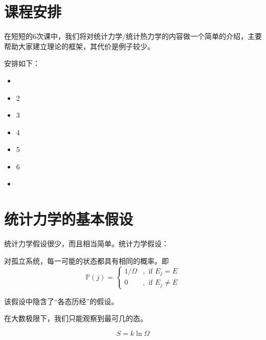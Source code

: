 \chapter*{课程安排}

在短短的6次课中，我们将对统计力学/统计热力学的内容做一个简单的介绍，主要帮助大家建立理论的框架，其代价是例子较少。

安排如下：
\begin{itemize}
    \item 
    \item 2
    \item 3
    \item 4
    \item 5
    \item 6
    \item 
\end{itemize}



\chapter{统计力学的基本假设}
统计力学假设很少，而且相当简单。统计力学假设：


\begin{hypo}
对孤立系统，每一可能的状态都具有相同的概率。即
\begin{equation}
    \mathbb{P}(j) = \left\{
        \begin{aligned}
            1/\Omega &, \text{ if } E_j = E \\
            0 &, \text{ if } E_j \neq E
        \end{aligned}
    \right.
\end{equation}
\end{hypo}

\begin{rek}
    该假设中隐含了“各态历经”的假设。
\end{rek}

\begin{rek}
    在大数极限下，我们只能观察到最可几的态。
\end{rek}

\begin{equation}
    S = k \ln \Omega
\end{equation}